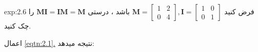 {\begin{spacing}{1.5}
        \begin{example}{exp:2.6}
            \Large
            فرض کنید
            $\textbf{M}=\begin{bmatrix}
                            1 & 2 \\
                            0 & 4
            \end{bmatrix}, \textbf{I}=\begin{bmatrix}
                                          1 & 0 \\
                                          0 & 1
            \end{bmatrix}$
            باشد ، درستی $\textbf{MI}=\textbf{IM}=\textbf{M}$ را چک کنید.

            اعمال \hyperref[eqtn:2.1]{\ref{eqtn:2.1}.} نتیجه میدهد:


\end{example}
\end{spacing}}
